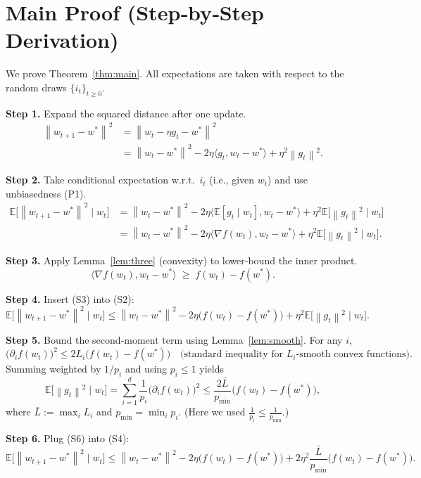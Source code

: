 \documentclass{article}
\newcommand{\E}{\mathbb{E}}
\newcommand{\norm}[1]{\left\|#1\right\|}
\newcommand{\ip}[2]{\langle #1,#2\rangle}
\begin{document}
\section*{Main Proof (Step‑by‑Step Derivation)}
We prove Theorem~\ref{thm:main}. All expectations are taken with respect to the random draws
$\{i_t\}_{t\ge0}$.

\noindent\textbf{Step 1.} Expand the squared distance after one update.
\[
\begin{aligned}
\norm{w_{t+1}-w^*}^2
&=\norm{w_t-\eta g_t-w^*}^2 \\
&=\norm{w_t-w^*}^2-2\eta\ip{g_t}{w_t-w^*}+\eta^2\norm{g_t}^2.
\end{aligned}
\tag{S1}
\]

\noindent\textbf{Step 2.} Take conditional expectation w.r.t.\ $i_t$ (i.e., given $w_t$) and use unbiasedness (P1).
\[
\begin{aligned}
\E\!\big[\norm{w_{t+1}-w^*}^2\mid w_t\big]
&=\norm{w_t-w^*}^2-2\eta\ip{\E[g_t\mid w_t]}{w_t-w^*}
      +\eta^2\E\!\big[\norm{g_t}^2\mid w_t\big] \\
&=\norm{w_t-w^*}^2-2\eta\ip{\nabla f(w_t)}{w_t-w^*}
      +\eta^2\E\!\big[\norm{g_t}^2\mid w_t\big].
\end{aligned}
\tag{S2}
\]

\noindent\textbf{Step 3.} Apply Lemma~\ref{lem:three} (convexity) to lower‑bound the inner product.
\[
\ip{\nabla f(w_t)}{w_t-w^*}\;\ge\; f(w_t)-f(w^*).
\tag{S3}
\]

\noindent\textbf{Step 4.} Insert (S3) into (S2):
\[
\E\!\big[\norm{w_{t+1}-w^*}^2\mid w_t\big]
\le \norm{w_t-w^*}^2-2\eta\big(f(w_t)-f(w^*)\big)
      +\eta^2\E\!\big[\norm{g_t}^2\mid w_t\big].
\tag{S4}
\]

\noindent\textbf{Step 5.} Bound the second‑moment term using Lemma~\ref{lem:smooth}.
For any $i$,
\[
\big(\partial_i f(w_t)\big)^2\le 2L_i\big(f(w_t)-f(w^*)\big) \quad\text{(standard inequality for $L_i$‑smooth convex functions)}.
\tag{S5}
\]
Summing weighted by $1/p_i$ and using $p_i\le1$ yields
\[
\E\!\big[\norm{g_t}^2\mid w_t\big]
= \sum_{i=1}^d\frac{1}{p_i}\big(\partial_i f(w_t)\big)^2
\le \frac{2\bar L}{p_{\min}}\big(f(w_t)-f(w^*)\big),
\tag{S6}
\]
where $\displaystyle\bar L:=\max_i L_i$ and $p_{\min}=\min_i p_i$.
(Here we used $\frac{1}{p_i}\le\frac{1}{p_{\min}}$.)

\noindent\textbf{Step 6.} Plug (S6) into (S4):
\[
\E\!\big[\norm{w_{t+1}-w^*}^2\mid w_t\big]
\le \norm{w_t-w^*}^2-2\eta\big(f(w_t)-f(w^*)\big)
   +2\eta^2\frac{\bar L}{p_{\min}}\big(f(w_t)-f(w^*)\big).
\tag{S7}
\]
\end{document}

